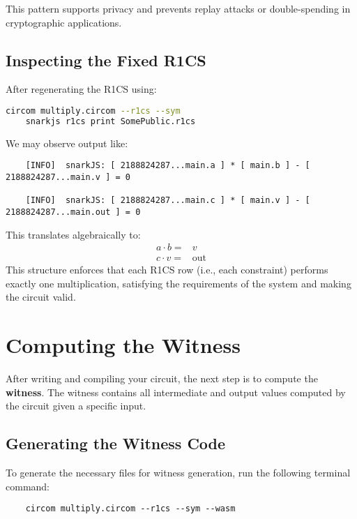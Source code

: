 \documentclass{article}
\begin{document}
This pattern supports privacy and prevents replay attacks or double-spending in cryptographic applications.

\subsection*{Inspecting the Fixed R1CS}

After regenerating the R1CS using:

\begin{lstlisting}[language=bash]
	circom multiply.circom --r1cs --sym
	snarkjs r1cs print SomePublic.r1cs
\end{lstlisting}

We may observe output like:

\begin{verbatim}
	[INFO]  snarkJS: [ 2188824287...main.a ] * [ main.b ] - [ 2188824287...main.v ] = 0
	
	[INFO]  snarkJS: [ 2188824287...main.c ] * [ main.v ] - [ 2188824287...main.out ] = 0
\end{verbatim}

This translates algebraically to:
\begin{align*}
	a \cdot b  = &v\\
	c \cdot v = &\text{out}
\end{align*}  
This structure enforces that each R1CS row (i.e., each constraint) performs exactly one multiplication, satisfying the requirements of the system and making the circuit valid.

\section{Computing the Witness}

After writing and compiling your circuit, the next step is to compute the \textbf{witness}. The witness contains all intermediate and output values computed by the circuit given a specific input.

\subsection*{Generating the Witness Code}

To generate the necessary files for witness generation, run the following terminal command:

\begin{verbatim}
	circom multiply.circom --r1cs --sym --wasm
\end{verbatim}
\end{document}

